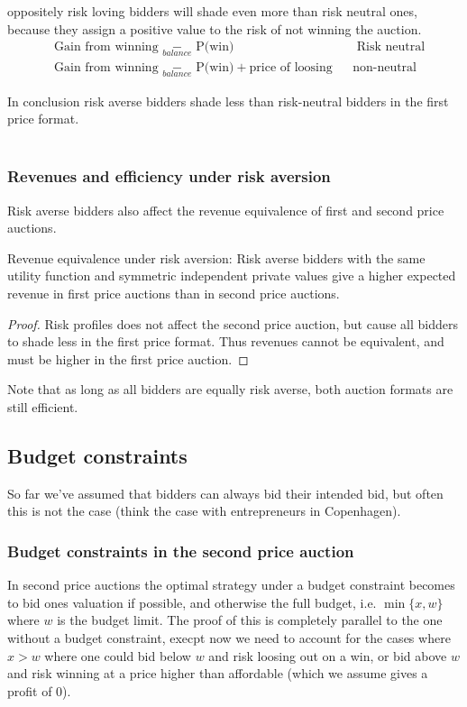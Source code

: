 oppositely risk loving bidders will shade even more than risk neutral ones, because they assign a positive value to the risk of not winning the auction.
\begin{align*}
  &\textrm{Gain from winning } \underset{balance}{-} \textrm{ P(win)} && \textrm{ Risk neutral} \\
  & \textrm{Gain from winning }  \underset{balance}{-} \textrm{ P(win)} + \textrm{price of loosing} && \textrm{non-neutral}
\end{align*}

In conclusion risk averse bidders shade less than risk-neutral bidders in the first price format.
\\ \\
\subsubsection{Revenues and efficiency under risk aversion}
Risk averse bidders also affect the revenue equivalence of first and second price auctions.
\begin{proposition}{Revenue equivalence under risk aversion:} Risk averse bidders with the same utility function and symmetric independent private values give a higher expected revenue in first price auctions than in second price auctions.
\end{proposition}
\begin{proof}
  Risk profiles does not affect the second price auction, but cause all bidders to shade less in the first price format. Thus revenues cannot be equivalent, and must be higher in the first price auction.
\end{proof}
Note that as long as all bidders are equally risk averse, both auction formats are still efficient.

\subsection{Budget constraints}
So far we've assumed that bidders can always bid their intended bid, but often this is not the case (think the case with entrepreneurs in Copenhagen).

\subsubsection{Budget constraints in the second price auction}
In second price auctions the optimal strategy under a budget constraint becomes to bid ones valuation if possible, and otherwise the full budget, i.e. $\min\{x,w\}$ where $w$ is the budget limit. The proof of this is completely parallel to the one without a budget constraint, execpt now we need to account for the cases where $x>w$ where one could bid below $w$ and risk loosing out on a win, or bid above $w$ and risk winning at a price higher than affordable (which we assume gives a profit of 0).

